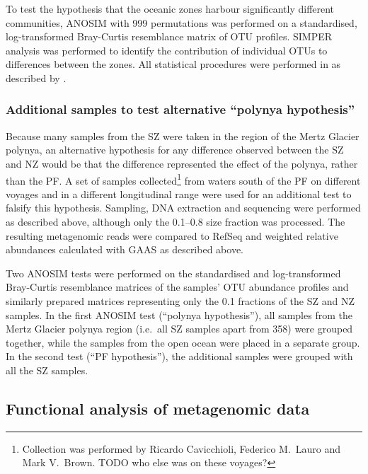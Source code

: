 To test the hypothesis that the oceanic zones harbour significantly different communities, \ac{ANOSIM} with 999 permutations was performed on a standardised, log-transformed Bray-Curtis resemblance matrix of \ac{OTU} profiles.
\ac{SIMPER} analysis was performed to identify the contribution of individual \acp{OTU} to differences between the zones. 
All statistical procedures were performed in  as described by \citet{Clarke:2001ut}.

\subsubsection{Additional samples to test alternative ``polynya hypothesis''}
Because many samples from the \ac{SZ} were taken in the region of the Mertz Glacier polynya, an alternative hypothesis for any difference observed between the \ac{SZ} and \ac{NZ} would be that the difference represented the effect of the polynya, rather than the \ac{PF}.
A set of samples collected\footnote{Collection was performed by Ricardo Cavicchioli, Federico M.\ Lauro and Mark V.\ Brown. TODO who else was on these voyages?} from waters south of the \ac{PF} on different voyages and in a different longitudinal range were used for an additional test to falsify this hypothesis.
Sampling, DNA extraction and sequencing were performed as described above, although only the 0.1--0.8 \micron{} size fraction was processed.
The resulting metagenomic reads were compared to RefSeq and weighted relative abundances calculated with \ac{GAAS} as described above.



Two \ac{ANOSIM} tests were performed on the standardised and log-transformed Bray-Curtis resemblance matrices of the samples' \ac{OTU} abundance profiles and similarly prepared matrices representing only the 0.1 \micron{} fractions of the \ac{SZ} and \ac{NZ} samples.
In the first \ac{ANOSIM} test (``polynya hypothesis''), all samples from the Mertz Glacier polynya region (i.e.\ all \ac{SZ} samples apart from 358) were grouped together, while the samples from the open ocean were placed in a separate group.
In the second test (``\ac{PF} hypothesis''), the additional samples were grouped with all the \ac{SZ} samples.

\subsection{Functional analysis of metagenomic data}

